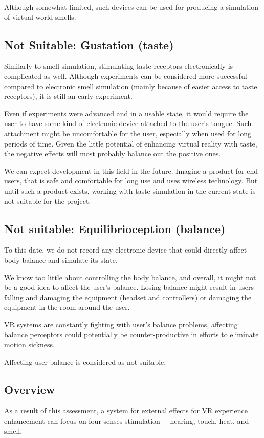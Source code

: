 Although somewhat limited, such devices can be used for producing a simulation
of virtual world smells.


\hypertarget{x-not-suitable:-gustation-(taste)}{\subsection{Not Suitable: Gustation (taste)}}
Similarly to smell simulation, stimulating taste receptors electronically is
complicated as well. Although experiments can be considered more successful
compared to electronic smell simulation (mainly because of easier access
to taste receptors), it is still an early experiment. \cite{stsie}


Even if experiments were advanced and in a usable state, it would
require the user to have some kind of electronic device attached to the user’s
tongue. Such attachment might be uncomfortable for the user, especially when
used for long periods of time. Given the little potential of enhancing virtual
reality with taste, the negative effects will most probably balance out
the positive ones.


We can expect development in this field in the future. Imagine a product
for end-users, that is safe and comfortable for long use and uses wireless
technology. But until such a product exists, working with taste simulation
in the current state is not suitable for the project.


\subsection{Not suitable: Equilibrioception (balance)}
To this date, we do not record any electronic device that could
directly affect body balance and simulate its state.


We know too little about controlling the body balance, and overall,
it might not be a good idea to affect the user’s balance. Losing
balance might result in users falling and damaging the equipment (headset and
controllers) or damaging the equipment in the room around the user.


VR systems are constantly fighting with user’s balance problems,
affecting balance perceptors could potentially be
counter-productive in efforts to eliminate motion sickness.


Affecting user balance is considered as not suitable.


\hypertarget{x-overview}{\subsection{Overview}}
As a result of this assessment, a system for external effects for VR experience
enhancement can focus on four senses stimulation — hearing, touch, heat,
and smell.



